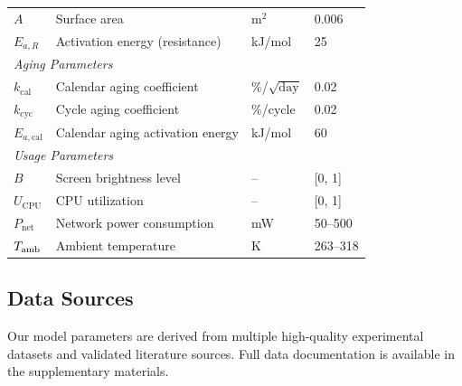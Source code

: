 \begin{table}[H]
\begin{tabular}{llll}
        $A$ & Surface area & m$^2$ & 0.006 \\
        $E_{a,R}$ & Activation energy (resistance) & kJ/mol & 25 \\
        \midrule
        \multicolumn{4}{l}{\textit{Aging Parameters}} \\
        $k_{\text{cal}}$ & Calendar aging coefficient & \%/$\sqrt{\text{day}}$ & 0.02 \\
        $k_{\text{cyc}}$ & Cycle aging coefficient & \%/cycle & 0.02 \\
        $E_{a,\text{cal}}$ & Calendar aging activation energy & kJ/mol & 60 \\
        \midrule
        \multicolumn{4}{l}{\textit{Usage Parameters}} \\
        $B$ & Screen brightness level & -- & [0, 1] \\
        $U_{\text{CPU}}$ & CPU utilization & -- & [0, 1] \\
        $P_{\text{net}}$ & Network power consumption & mW & 50--500 \\
        $T_{\text{amb}}$ & Ambient temperature & K & 263--318 \\
        \bottomrule
    \end{tabular}
\end{table}

\subsection{Data Sources}
\label{subsec:data}

Our model parameters are derived from multiple high-quality experimental datasets and validated literature sources. Full data documentation is available in the supplementary materials.


